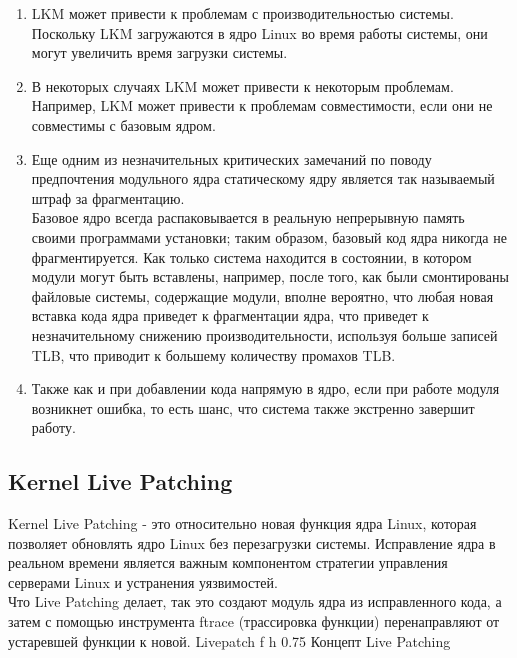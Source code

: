 \begin{enumerate}
    \item LKM может привести к проблемам с производительностью системы. \vspace{5mm}\\
    Поскольку LKM загружаются в ядро Linux во время работы системы, они могут увеличить время загрузки системы.
    \item В некоторых случаях LKM может привести к некоторым проблемам. \vspace{5mm}\\
    Например, LKM может привести к проблемам совместимости, если они не совместимы с базовым ядром.
    \item Еще одним из незначительных критических замечаний по поводу предпочтения модульного ядра статическому ядру является так называемый штраф за фрагментацию. \vspace{5mm}\\
    Базовое ядро всегда распаковывается в реальную непрерывную память своими программами установки;
    таким образом, базовый код ядра никогда не фрагментируется.
    Как только система находится в состоянии, в котором модули могут быть вставлены, например, после того, как были смонтированы файловые системы, содержащие модули, вполне вероятно,
    что любая новая вставка кода ядра приведет к фрагментации ядра, что приведет к незначительному снижению производительности, используя больше записей TLB,
    что приводит к большему количеству промахов TLB\@.
    \item Также как и при добавлении кода напрямую в ядро, если при работе модуля возникнет ошибка, то есть шанс, что система также экстренно завершит работу.
\end{enumerate}

\subsection{Kernel Live Patching}\label{subsec:kernel-live-patching}

Kernel Live Patching - это относительно новая функция ядра Linux, которая позволяет обновлять ядро Linux без перезагрузки системы.
Исправление ядра в реальном времени является важным компонентом стратегии управления серверами Linux и устранения уязвимостей.
\\
Что Live Patching делает, так это создают модуль ядра из исправленного кода, а затем с помощью инструмента ftrace (трассировка функции) перенаправляют от устаревшей функции к новой.
{Livepatch} %
{f}
{h}
{0.75\textwidth} %
{Концепт Live Patching} %

